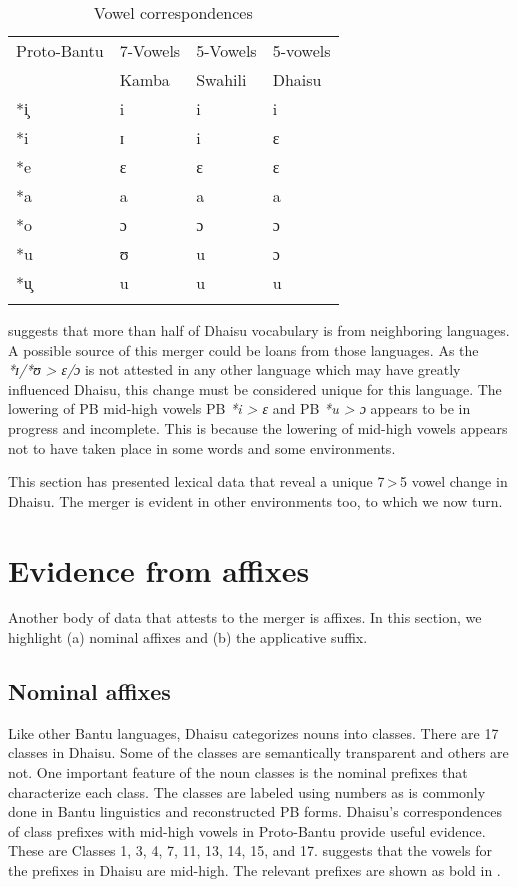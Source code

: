 \documentclass[output=paper,colorlinks,citecolor=brown]{langscibook}
\begin{document}
\begin{table}
	\caption{Vowel correspondences} 
    \label{tab:ngonyani:13}
    \begin{tabular}{llll}
    \lsptoprule
        Proto-Bantu &	7-Vowels	& 5-Vowels & 5-vowels\\
         & Kamba & Swahili & Dhaisu \\
    \midrule
        *i̧ & i & i & i\\
        *i & ɪ & i & ɛ \\
        *e & ɛ & ɛ & ɛ \\
        *a & a & a & a \\
        *o & ɔ & ɔ & ɔ \\
        *u & ʊ & u & ɔ\\
        *u̧ & u & u & u \\
    \lspbottomrule
    \end{tabular}
\end{table}
\citet[20]{Nurse2000} suggests that more than half of Dhaisu vocabulary is from neighboring languages. A possible source of this merger could be loans from those languages. As the  \textit{*ɪ/*ʊ > ɛ/ɔ} is not attested in any other language which may have greatly influenced Dhaisu, this change must be considered unique for this language. The lowering of PB mid-high vowels  PB \textit{*i > ɛ} and PB \textit{*u > ɔ} appears to be in progress and incomplete. This is because the lowering of mid-high vowels appears not to have taken place in some words and some environments. 

This section has presented lexical data that reveal a unique 7\,>\,5 vowel change in Dhaisu. The merger is evident in other environments too, to which we now turn. 

\section{Evidence from affixes}\label{sec:ngonyani:4}

Another body of data that attests to the merger is affixes. In this section, we highlight (a) nominal affixes and (b) the applicative suffix.

\subsection{Nominal affixes}\label{sec:ngonyani:4.1}

Like other Bantu languages, Dhaisu categorizes nouns into classes. There are 17 classes in Dhaisu. Some of the classes are semantically transparent and others are not. One important feature of the noun classes is the nominal prefixes that characterize each class. The classes are labeled using numbers as is commonly done in Bantu linguistics and reconstructed PB forms. Dhaisu’s correspondences of class prefixes with mid-high vowels in Proto-Bantu provide useful evidence. These are Classes 1, 3, 4, 7, 11, 13, 14, 15, and 17.  \citet[22]{Nurse2000} suggests that the vowels for the prefixes in Dhaisu are mid-high. The relevant prefixes are shown as bold in .
\end{document}
